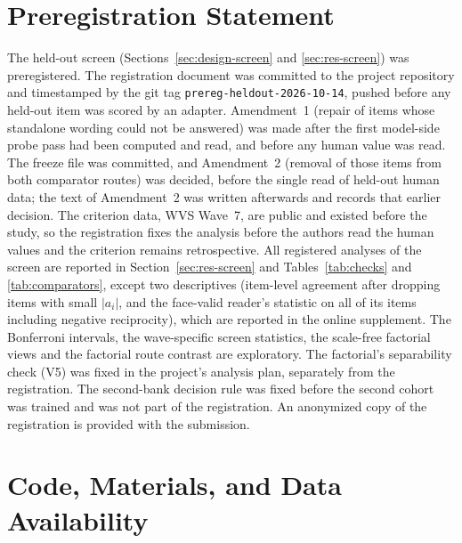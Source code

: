 \section*{Preregistration Statement}

The held-out screen (Sections~\ref{sec:design-screen} and \ref{sec:res-screen}) was preregistered. The registration document was committed to the project repository and timestamped by the git tag \texttt{prereg-heldout-2026-10-14}, pushed before any held-out item was scored by an adapter. Amendment~1 (repair of  items whose standalone wording could not be answered) was made after the first model-side probe pass had been computed and read, and before any human value was read. The freeze file was committed, and Amendment~2 (removal of those items from both comparator routes) was decided, before the single read of held-out human data; the text of Amendment~2 was written afterwards and records that earlier decision. The criterion data, WVS Wave~7, are public and existed before the study, so the registration fixes the analysis before the authors read the human values and the criterion remains retrospective. All registered analyses of the screen are reported in Section~\ref{sec:res-screen} and Tables~\ref{tab:checks} and \ref{tab:comparators}, except two descriptives (item-level agreement after dropping items with small $|a_i|$, and the face-valid reader's statistic on all of its items including negative reciprocity), which are reported in the online supplement.
The Bonferroni intervals, the wave-specific screen statistics, the scale-free factorial views and the factorial route contrast are exploratory. The factorial's separability check (V5) was fixed in the project's analysis plan, separately from the registration. The second-bank decision rule was fixed before the second cohort was trained and was not part of the registration. An anonymized copy of the registration is provided with the submission. %

\section*{Code, Materials, and Data Availability}


